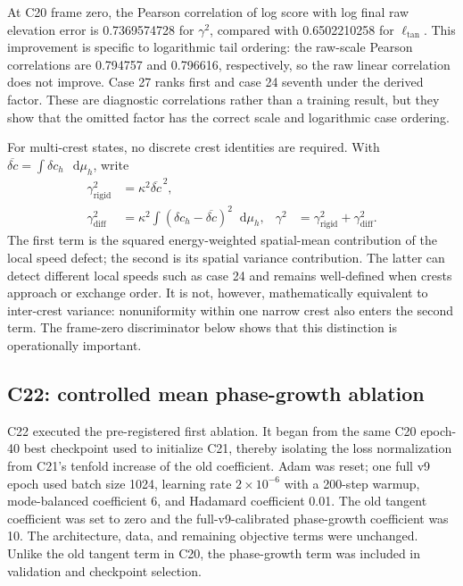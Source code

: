 \documentclass[11pt]{article}
\newcommand{\dd}{\mathop{}\!\mathrm{d}}
\begin{document}
At C20 frame zero, the Pearson correlation of log score with log final raw
elevation error is 0.7369574728 for \(\gamma^2\), compared with 0.6502210258 for
\(\ell_{\mathrm{tan}}\).  This improvement is specific to logarithmic tail
ordering: the raw-scale Pearson correlations are 0.794757 and 0.796616,
respectively, so the raw linear correlation does not improve.  Case 27 ranks
first and case 24 seventh under the derived factor.  These are diagnostic
correlations rather than a training result, but they show that the omitted
factor has the correct scale and logarithmic case ordering.

For multi-crest states, no discrete crest identities are required.  With
\(\overline{\delta c}=\int\delta c_h\,\dd\mu_h\), write
\begin{align}
 \gamma_{\mathrm{rigid}}^2
 &=\kappa^2\overline{\delta c}^{\,2},\nonumber\\
 \gamma_{\mathrm{diff}}^2
 &=\kappa^2\int(\delta c_h-\overline{\delta c})^2\dd\mu_h,
 &\gamma^2&=\gamma_{\mathrm{rigid}}^2+\gamma_{\mathrm{diff}}^2.
 \label{eq:phase-risk-decomposition}
\end{align}
The first term is the squared energy-weighted spatial-mean contribution of the
local speed defect; the second is its spatial variance contribution.  The latter can detect different local
speeds such as case 24 and remains well-defined when crests approach or
exchange order.  It is not, however, mathematically equivalent to inter-crest
variance: nonuniformity within one narrow crest also enters the second term.
The frame-zero discriminator below shows that this distinction is operationally
important.

\subsection{C22: controlled mean phase-growth ablation}

C22 executed the pre-registered first ablation.  It began from the same C20
epoch-40 best checkpoint used to initialize C21, thereby isolating the loss
normalization from C21's tenfold increase of the old coefficient.  Adam was
reset; one full v9 epoch used batch size 1024, learning rate
\(2\times10^{-6}\) with a 200-step warmup, mode-balanced coefficient 6, and
Hadamard coefficient 0.01.  The old tangent coefficient was set to zero and
the full-v9-calibrated phase-growth coefficient was 10.  The architecture,
data, and remaining objective terms were unchanged.  Unlike the old tangent
term in C20, the phase-growth term was included in validation and checkpoint
selection.
\end{document}

